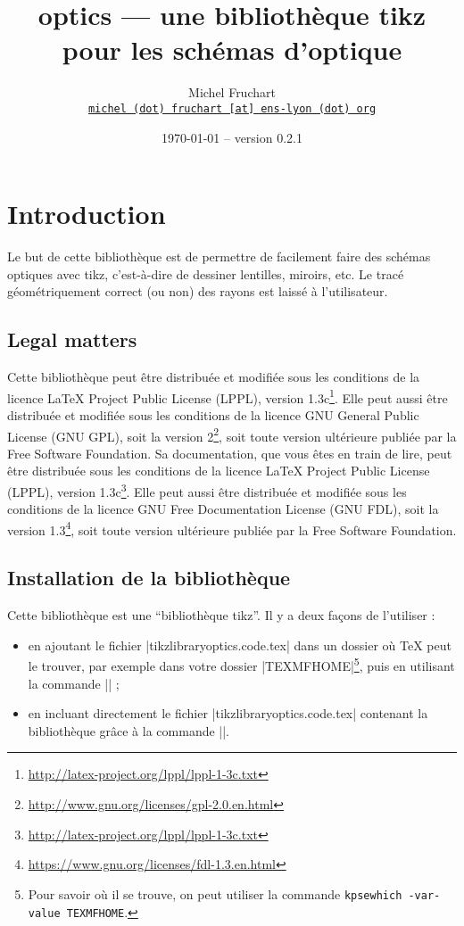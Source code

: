 \documentclass[a4paper]{ltxdoc}
\begin{document}
\VerbatimFootnotes

\title{optics --- une bibliothèque tikz pour les schémas d'optique}
\author{Michel Fruchart \\
\href{mailto:michel (dot) fruchart [at] ens-lyon (dot) org}{\texttt{michel (dot) fruchart [at] ens-lyon (dot) org}}
}
\date{\today{} -- version 0.2.1}

\maketitle

\section{Introduction}

Le but de cette bibliothèque est de permettre de facilement faire des schémas optiques avec tikz, c'est-à-dire de dessiner lentilles, miroirs, etc. Le tracé géométriquement correct (ou non) des rayons est laissé à l'utilisateur.


\subsection{Legal matters}

Cette bibliothèque peut être distribuée et modifiée sous les conditions de la licence LaTeX Project Public License (LPPL), version 1.3c\footnote{\url{http://latex-project.org/lppl/lppl-1-3c.txt}}. Elle peut aussi être distribuée et modifiée sous les conditions de la licence GNU General Public License (GNU GPL), soit la version 2\footnote{\url{http://www.gnu.org/licenses/gpl-2.0.en.html}}, soit toute version ultérieure publiée par la Free Software Foundation. Sa documentation, que vous êtes en train de lire, peut être distribuée sous les conditions de la licence LaTeX Project Public License (LPPL), version 1.3c\footnote{\url{http://latex-project.org/lppl/lppl-1-3c.txt}}. Elle peut aussi être distribuée et modifiée sous les conditions de la licence GNU Free Documentation License (GNU FDL), soit la version 1.3\footnote{\url{https://www.gnu.org/licenses/fdl-1.3.en.html}}, soit toute version ultérieure publiée par la Free Software Foundation.

\subsection{Installation de la bibliothèque}

Cette bibliothèque est une \enquote{bibliothèque tikz}. Il y a deux façons de l'utiliser : 
\begin{itemize}
  \item en ajoutant le fichier |tikzlibraryoptics.code.tex| dans un dossier où \TeX{} peut le trouver, par exemple dans votre dossier |TEXMFHOME|\footnote{Pour savoir où il se trouve, on peut utiliser la commande \verb|kpsewhich -var-value TEXMFHOME|. }, puis en utilisant la commande |\usetikzlibrary{optics}| ;
  \item en incluant directement le fichier |tikzlibraryoptics.code.tex| contenant la bibliothèque grâce à la commande ||.
\end{itemize}
\end{document}
